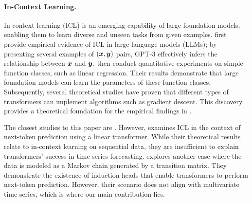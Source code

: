 \paragraph{In-Context Learning.}
In-context learning (ICL) is an emerging capability of large foundation models, enabling them to learn diverse and unseen tasks from given examples.
\cite{brown2020language} first provide empirical evidence of ICL in large language models (LLMs); by presenting several examples of 
$(\bm{x},\bm{y})$ pairs, GPT-3 effectively infers the relationship between $\bm{x}$ and $\bm{y}$.
\cite{garg2022can} then conduct quantitative experiments on simple function classes, such as linear regression.
Their results demonstrate that large foundation models can learn the parameters of these function classes.
Subsequently, several theoretical studies \cite{bai2024transformers, von2023transformers, ahn2024transformers, akyrek2023what} have proven that different types of transformers can implement algorithms such as gradient descent.
This discovery provides a theoretical foundation for the empirical findings in \cite{garg2022can}.


The closest studies to this paper are \cite{nichani2024transformers, sander2024transformers}.
However, \cite{sander2024transformers} examines ICL in the context of next-token prediction using a linear transformer.
While their theoretical results relate to in-context learning on sequential data, they are insufficient to explain transformers' success in time series forecasting.
\cite{nichani2024transformers} explores another case where the data is modeled as a Markov chain generated by a transition matrix.
They demonstrate the existence of induction heads that enable transformers to perform next-token prediction.
However, their scenario does not align with multivariate time series, which is where our main contribution lies.

